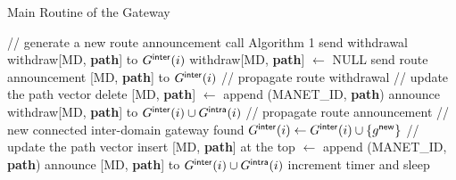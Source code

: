 \begin{algorithm}[htb!]
\caption{Main Routine of the Gateway}
\label{alg:newconn}
{\small
\begin{algorithmic}
\STATE // generate a new route announcement
\STATE call Algorithm 1
\STATE send withdrawal withdraw[MD, {\bf path}] to $G^{\sf inter}(i)$
\STATE withdraw[MD, {\bf path}]  $\leftarrow$ NULL
\ENDIF
\STATE send route announcement [MD, {\bf path}] to $G^{\sf inter}(i)$
\ENDIF
\ENDIF
\STATE // propagate route withdrawal 
\STATE // update the path vector
\STATE delete [MD, {\bf path}]
 $\leftarrow$ append (MANET\_ID, {\bf path})
\STATE announce withdraw[MD, {\bf path}] to $G^{\sf inter}(i) \cup G^{\sf intra}(i)$
\ENDIF
\STATE // propagate route announcement 
\STATE // new connected inter-domain gateway found
\STATE $G^{\sf inter}(i) \leftarrow G^{\sf inter}(i) \cup \{ g^{\sf new} \}$
\ENDIF
\STATE // update the path vector
\STATE insert [MD, {\bf path}] at the top
 $\leftarrow$ append (MANET\_ID, {\bf path})
\STATE announce [MD, {\bf path}] to $G^{\sf inter}(i) \cup G^{\sf intra}(i)$
\ENDIF
\ENDIF
\STATE increment timer and sleep
\ENDWHILE
\end{algorithmic}  
}
\end{algorithm} 



